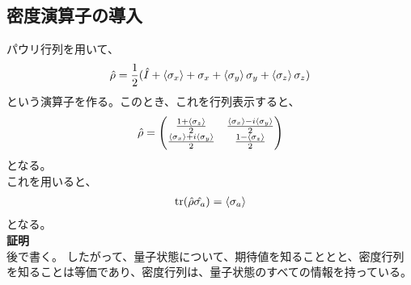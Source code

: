 \documentclass[a4paper,11pt]{jsarticle}
\begin{document}
\subsection{密度演算子の導入}
パウリ行列を用いて、
\begin{align}
    \hat{\rho} =\frac{1}{2}(\hat I +\ev{\sigma_x}+\sigma_x + \ev{\sigma_y}\sigma_y + \ev{\sigma_z}\sigma_z)
\end{align}
という演算子を作る。このとき、これを行列表示すると、
\begin{align}
    \hat{\rho} = \begin{pmatrix}
        \frac{1+\ev{\sigma_z}}{2} & \frac{\ev{\sigma_x}-i\ev{\sigma_y}}{2} \\
        \frac{\ev{\sigma_x}+i\ev{\sigma_y}}{2} & \frac{1-\ev{\sigma_z}}{2}
    \end{pmatrix}
\end{align}
となる。\\
これを用いると、
\begin{align}
    \trace({\hat{\rho}\hat{\sigma_a}})=\ev{\sigma_a}
\end{align}
となる。\\
\textbf{証明}\\
後で書く。
したがって、量子状態について、期待値を知ることとと、密度行列を知ることは等価であり、密度行列は、量子状態のすべての情報を持っている。\\
\end{document}
